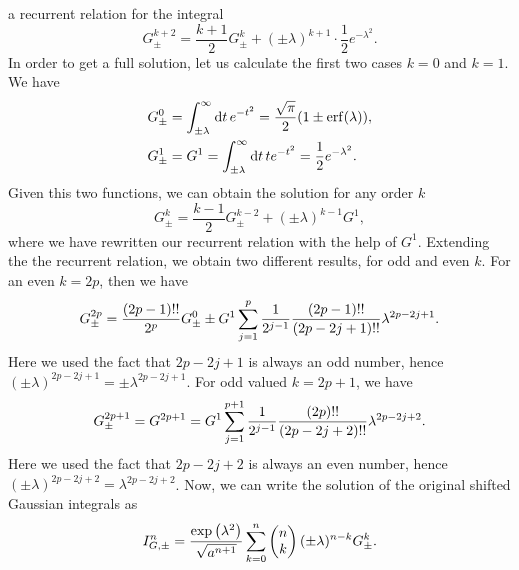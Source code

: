 \documentclass[aps,prl,preprint,groupedaddress,10pt]{revtex4-2}
\begin{document}
a recurrent relation for the integral
\begin{equation}
    G^{k+2}_{\pm}=\frac{k+1}{2}G^k_{\pm}+(\pm\lambda)^{k+1}\cdot\frac{1}{2}e^{-\lambda^2}.
\end{equation}
In order to get a full solution, let us calculate the first two cases $k=0$ and $k=1$.
We have
\begin{equation}
    \begin{split}
        G^0_{\pm}&=\int_{\pm\lambda}^{\infty}\dd{t}e^{-t^2}=
        \frac{\sqrt{\pi}}{2}\pqty{1\pm\erf(\lambda)},\\
        G^1_{\pm}&=G^1=\int_{\pm\lambda}^{\infty}\dd{t}te^{-t^2}=\frac{1}{2}e^{-\lambda^2}.
    \end{split}
\end{equation}
Given this two functions, we can obtain the solution for any order $k$
\begin{equation}
    G^k_{\pm}=\frac{k-1}{2}G^{k-2}_{\pm}+(\pm\lambda)^{k-1}G^1,
\end{equation}
where we have rewritten our recurrent relation with the help of $G^1$.
Extending the the recurrent relation, we obtain two different results, for odd and even $k$.
For an even $k=2p$, then we have
\begin{equation}\label{eq:shifted_gaussian_even}
    G^{2p}_{\pm}=\frac{\pqty{2p-1}!!}{2^p}G^0_{\pm}\pm G^1\sum_{j=1}^{p}
    \frac{1}{2^{j-1}}\frac{\pqty{2p-1}!!}{\pqty{2p-2j+1}!!}\lambda^{2p-2j+1}.
\end{equation}
Here we used the fact that $2p-2j+1$ is always an odd number, hence
$(\pm\lambda)^{2p-2j+1}=\pm\lambda^{2p-2j+1}$. For odd valued $k=2p+1$, we have
\begin{equation}\label{eq:shifted_gaussian_odd}
    G^{2p+1}_{\pm}=G^{2p+1}=G^1\sum_{j=1}^{p+1}\frac{1}{2^{j-1}}
    \frac{\pqty{2p}!!}{\pqty{2p-2j+2}!!}\lambda^{2p-2j+2}.
\end{equation}
Here we used the fact that $2p-2j+2$ is always an even number, hence
$(\pm\lambda)^{2p-2j+2}=\lambda^{2p-2j+2}$.
Now, we can write the solution of the original shifted Gaussian integrals as
\begin{equation}\label{eq:shifted_gaussian_integrals}
    I_{G,\pm}^{n}=\frac{\exp\pqty{\lambda^2}}{\sqrt{a^{n+1}}}\sum_{k=0}^{n}\pmqty{n\\k}
    (\pm\lambda)^{n-k}G^{k}_{\pm}.
\end{equation}
\end{document}
